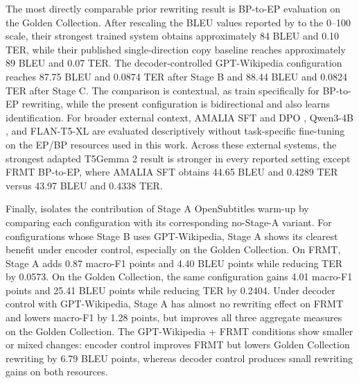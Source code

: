 \documentclass[acmtog,nonacm]{acmart}
\begin{document}
The most directly comparable prior rewriting result is BP-to-EP evaluation on
the Golden Collection. After rescaling the BLEU values reported by
\citet{sanches2024brazilianportugueseeuropeanportuguese} to the 0--100 scale,
their strongest trained system obtains approximately 84 BLEU and 0.10 TER,
while their published single-direction copy baseline reaches approximately 89
BLEU and 0.07 TER. The decoder-controlled GPT-Wikipedia configuration reaches
87.75 BLEU and 0.0874 TER after Stage B and 88.44 BLEU and 0.0824 TER after
Stage C. The comparison is contextual, as \citet{sanches2024brazilianportugueseeuropeanportuguese} train specifically for
BP-to-EP rewriting, while the present configuration is bidirectional and also
learns identification. For broader external context, AMALIA SFT and DPO \citep{simplicio2026amalia}, Qwen3-4B \citep{yang2025qwen3technicalreport}, and FLAN-T5-XL \citep{3722577.3722647} are evaluated descriptively without task-specific fine-tuning on the EP/BP resources used in this work. Across these external systems, the strongest adapted T5Gemma 2 result is stronger in every reported setting except FRMT BP-to-EP, where AMALIA SFT obtains 44.65 BLEU and 0.4289 TER versus 43.97 BLEU and 0.4338 TER.

Finally,  isolates the contribution of Stage A
OpenSubtitles warm-up by comparing each configuration with its corresponding
no-Stage-A variant. For configurations whose Stage B uses GPT-Wikipedia, Stage A shows its clearest benefit under encoder control, especially on the Golden Collection. On FRMT, Stage A adds 0.87
macro-F1 points and 4.40 BLEU points while reducing TER by 0.0573. On the
Golden Collection, the same configuration gains 4.01 macro-F1 points and 25.41
BLEU points while reducing TER by 0.2404. Under decoder control with
GPT-Wikipedia, Stage A has almost no rewriting effect on FRMT and lowers
macro-F1 by 1.28 points, but improves all three aggregate measures on the
Golden Collection. The GPT-Wikipedia + FRMT conditions show smaller or mixed
changes: encoder control improves FRMT but lowers Golden Collection rewriting
by 6.79 BLEU points, whereas decoder control produces small rewriting gains on
both resources.
\end{document}
